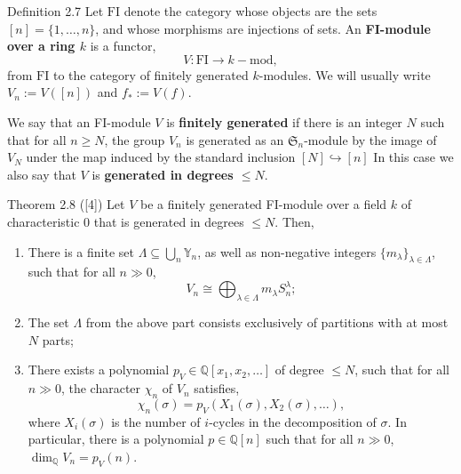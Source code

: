 \begin{sourceblock}{Definition 2.7}
Let $\mathrm{FI}$ denote the category whose objects are the sets $[n]=\{1,\ldots,n\}$, and whose morphisms are injections of sets. An \textbf{FI-module over a ring $k$} is a functor,
\[
 V:\mathrm{FI}\to k-\mathrm{mod},
\]
from $\mathrm{FI}$ to the category of finitely generated $k$-modules. We will usually write $V_n:=V([n])$ and $f_*:=V(f)$.

We say that an FI-module $V$ is \textbf{finitely generated} if there is an integer $N$ such that for all $n\geq N$, the group $V_n$ is generated as an $\mathfrak{S}_n$-module by the image of $V_N$ under the map induced by the standard inclusion $[N]\hookrightarrow[n]$ In this case we also say that $V$ is \textbf{generated in degrees $\leq N$}.
\end{sourceblock}

\begin{sourceblock}{Theorem 2.8 ([4])}
Let $V$ be a finitely generated FI-module over a field $k$ of characteristic $0$ that is generated in degrees $\leq N$. Then,
\begin{enumerate}
\item There is a finite set $\Lambda\subseteq\bigcup_n\mathbb{Y}_n$, as well as non-negative integers $\{m_\lambda\}_{\lambda\in\Lambda}$, such that for all $n\gg0$,
\[
 V_n\cong\bigoplus_{\lambda\in\Lambda}m_\lambda S_n^\lambda;
\]
\item The set $\Lambda$ from the above part consists exclusively of partitions with at most $N$ parts;
\item There exists a polynomial $p_V\in\mathbb{Q}[x_1,x_2,\ldots]$ of degree $\leq N$, such that for all $n\gg0$, the character $\chi_n$ of $V_n$ satisfies,
\[
 \chi_n(\sigma)=p_V(X_1(\sigma),X_2(\sigma),\ldots),
\]
where $X_i(\sigma)$ is the number of $i$-cycles in the decomposition of $\sigma$. In particular, there is a polynomial $p\in\mathbb{Q}[n]$ such that for all $n\gg0$, $\dim_{\mathbb{Q}}V_n=p_V(n)$.
\end{enumerate}
\end{sourceblock}

